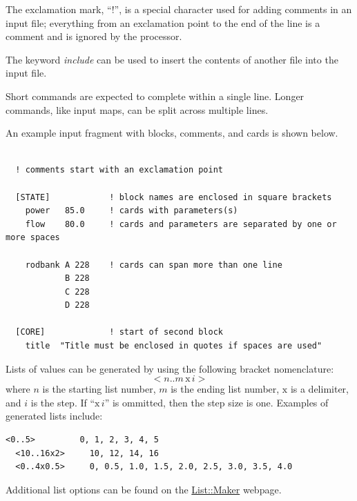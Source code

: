 \documentclass{vera-ornltm}
\begin{document}
The exclamation mark, ``!'',  is a special character used for adding comments in an input file; everything from an exclamation point to the
end of the line is a comment and is ignored by the processor.

The keyword {\it include} can be used to insert the contents of another file into the input file.

Short commands are expected to complete within a single line. Longer commands, like input maps,
can be split across multiple lines.

An example input fragment with blocks, comments, and cards is shown below.
\begin{Verbatim}[fontsize=\small]

  ! comments start with an exclamation point

  [STATE]            ! block names are enclosed in square brackets
    power   85.0     ! cards with parameters(s)
    flow    80.0     ! cards and parameters are separated by one or more spaces

    rodbank A 228    ! cards can span more than one line
            B 228
            C 228
            D 228

  [CORE]             ! start of second block
    title  "Title must be enclosed in quotes if spaces are used"

\end{Verbatim}

Lists of values can be generated by using the following bracket nomenclature:
$$ < n .. m \, \mbox{x} \, i > $$
where $n$ is the starting list number, $m$ is the ending list number, $\mbox{x}$ is a delimiter, and $i$ is the step.
If ``$\mbox{x} \, i$'' is ommitted, then the step size is one.
Examples of generated lists include:
\begin{Verbatim}[fontsize=\small]
  <0..5>         0, 1, 2, 3, 4, 5
  <10..16x2>     10, 12, 14, 16
  <0..4x0.5>     0, 0.5, 1.0, 1.5, 2.0, 2.5, 3.0, 3.5, 4.0

\end{Verbatim}
Additional list options can be found on the \href{https://metacpan.org/pod/release/DCONWAY/List-Maker-0.005/lib/List/Maker.pm}{List::Maker} webpage.




\end{document}
